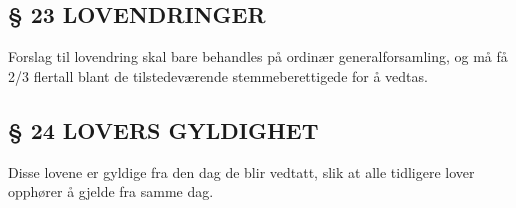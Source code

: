 \subsection*{§ 23 LOVENDRINGER}

Forslag til lovendring skal bare behandles på ordinær
generalforsamling, og må få 2/3 flertall blant de tilstedeværende
stemmeberettigede for å vedtas.


\subsection*{§ 24 LOVERS GYLDIGHET}

Disse lovene er gyldige fra den dag de blir vedtatt, slik at alle
tidligere lover opphører å gjelde fra samme dag.



